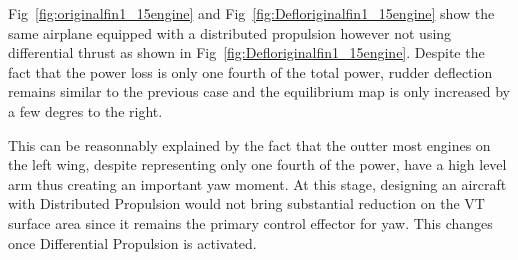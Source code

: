 Fig~\ref{fig:originalfin1_15engine} and Fig~\ref{fig:Defloriginalfin1_15engine} show the same airplane equipped with a distributed propulsion however not using differential thrust as shown in Fig~\ref{fig:Defloriginalfin1_15engine}. Despite the fact that the power loss is only one fourth of the total power, rudder deflection remains similar to the previous case and the equilibrium map is only increased by a few degres to the right.

This can be reasonnably explained by the fact that the outter most engines on the left wing, despite representing only one fourth of the power, have a high level arm thus creating an important yaw moment. At this stage, designing an aircraft with Distributed Propulsion would not bring substantial reduction on the VT surface area since it remains the primary control effector for yaw. This changes once Differential Propulsion is activated.

